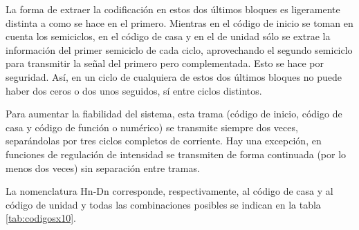 La forma de extraer la codificación en estos dos últimos bloques es ligeramente distinta a como se hace en el primero. Mientras en el código de inicio se toman en cuenta los semiciclos, en el código de casa y en el de unidad sólo se extrae la información del primer semiciclo de cada ciclo, aprovechando el segundo semiciclo para transmitir la señal del primero pero complementada. Esto se hace por seguridad. Así, en un ciclo de cualquiera de estos dos últimos bloques no puede haber dos ceros o dos unos seguidos, sí entre ciclos distintos.


Para aumentar la fiabilidad del sistema, esta trama (código de inicio, código de casa y código de función o numérico) se transmite siempre dos veces, separ\'andolas por tres ciclos completos de corriente. Hay una excepción, en funciones de regulación de intensidad se transmiten de forma continuada (por lo menos dos veces) sin separación entre tramas.


La nomenclatura Hn-Dn corresponde, respectivamente, al código de casa y al código de unidad y todas las combinaciones posibles se indican en la tabla \ref{tab:codigosx10}.

